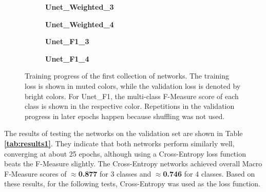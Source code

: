 \begin {figure}[!ht]
	\begin {subfigure}[b]{0.4\linewidth}
		\scalebox{0.65}{}
		\caption{\textbf{Unet\_Weighted\_3}}
	\end {subfigure}\hspace{1.75cm}
	\begin {subfigure}[b]{0.4\linewidth}
		\scalebox{0.65}{}
		\caption{\textbf{Unet\_Weighted\_4}}
	\end {subfigure}

	\begin {subfigure}[b]{0.4\linewidth}
		\scalebox{0.65}{}
		\caption{\textbf{Unet\_F1\_3}}
	\end {subfigure}\hspace{1.75cm}
	\begin {subfigure}[b]{0.4\linewidth}
		\scalebox{0.65}{}
		\caption{\textbf{Unet\_F1\_4}}
	\end {subfigure}

		\caption[Training progress of the first collection of networks.]{Training progress of the first collection of networks. The training loss is shown in muted colors, while the validation loss is denoted by bright colors. For Unet\_F1, the multi-class F-Measure score of each class is shown in the respective color. Repetitions in the validation progress in later epochs happen because shuffling was not used.}
		\label{fig:weighted_f1_training}
\end {figure}

\noindent The results of testing the networks on the validation set are shown in Table \textbf{\ref{tab:results1}}. They indicate that both networks perform similarly well, converging at about 25 epochs, although using a Cross-Entropy loss function beats the F-Measure slightly. The Cross-Entropy networks achieved overall Macro F-Measure scores of $\approx$\textbf{0.877} for 3 classes and $\approx$\textbf{0.746} for 4 classes. Based on these results, for the following tests, Cross-Entropy was used as the loss function.\\ 

